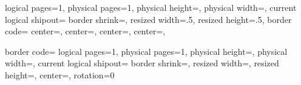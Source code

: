 %
{%
  \edef\pgfpageoptionheight{\the\paperheight}
  \edef\pgfpageoptionwidth{\the\paperwidth}
  \def\pgfpageoptionborder{0pt}
  \def\pgfpageoptionfirstshipout{1}
  \def\pgfpageoptionbordercode{}
}%
{%
  \pgfpagesphysicalpageoptions
  {%
    logical pages=1,%
    physical pages=1,%
    physical height=\pgfpageoptionheight,%
    physical width=\pgfpageoptionwidth,%
    current logical shipout=\pgfpageoptionfirstshipout%
  }
  \pgfpagessetdefaults
  {%
    border shrink=\pgfpageoptionborder,%
    resized width=.5\pgfphysicalwidth,%
    resized height=.5\pgfphysicalheight,%
    border code=\pgfpageoptionbordercode
  }
  {%
    center=\pgfpoint{.25\pgfphysicalwidth}{.25\pgfphysicalheight},
  }
  {%
    center=\pgfpoint{.75\pgfphysicalwidth}{.25\pgfphysicalheight},
  }
  {%
    center=\pgfpoint{.25\pgfphysicalwidth}{.75\pgfphysicalheight},
  }
  {%
    center=\pgfpoint{.75\pgfphysicalwidth}{.75\pgfphysicalheight},
  }
}

{%
  \edef\pgfpageoptionheight{\the\paperheight}
  \edef\pgfpageoptionwidth{\the\paperwidth}
  \def\pgfpageoptionborder{0pt}
  \def\pgfpageoptionfirstshipout{1}
  \def\pgfpageoptionbordercode{}
}%
{%
  \pgfpagessetdefaults
  {%
    border code=\pgfpageoptionbordercode
  }
  \pgfpagesphysicalpageoptions
  {%
    logical pages=1,%
    physical pages=1,%
    physical height=\pgfpageoptionheight,%
    physical width=\pgfpageoptionwidth,%
    current logical shipout=\pgfpageoptionfirstshipout%
  }
    {%
      border shrink=\pgfpageoptionborder,%
      resized width=\pgfphysicalwidth,%
      resized height=\pgfphysicalheight,%
      center=\pgfpoint{.5\pgfphysicalwidth}{.5\pgfphysicalheight},%
      rotation=0
    }%
}
